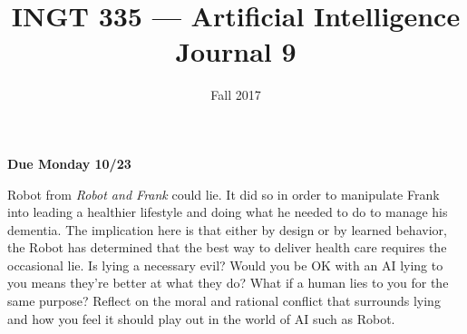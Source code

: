 \documentclass[nobib]{tufte-handout}
\title{INGT 335 --- Artificial Intelligence \\ Journal 9}
\author{}
\date{ Fall 2017 }
\begin{document}
\maketitle

\begin{center}
  \textbf{Due Monday 10/23}
\end{center}

Robot from \textit{Robot and Frank} could lie.  It did so in order to manipulate Frank into leading a healthier lifestyle and doing what he needed to do to manage his dementia.  The implication here is that either by design or by learned behavior, the Robot has determined that the best way to deliver health care requires the occasional lie. Is lying a necessary evil? Would you be OK with an AI lying to you means they're better at what they do? What if a human lies to you for the same purpose? Reflect on the moral and rational conflict that surrounds lying and how you feel it should play out in the world of AI such as Robot.
\end{document}
